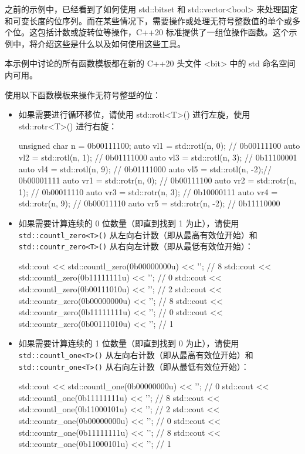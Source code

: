 之前的示例中，已经看到了如何使用 std::bitset 和 std::vector<bool> 来处理固定和可变长度的位序列。而在某些情况下，需要操作或处理无符号整数值的单个或多个位。这包括计数或旋转位等操作，C++20 标准提供了一组位操作函数。这个示例中，将介绍这些是什么以及如何使用这些工具。


本示例中讨论的所有函数模板都在新的 C++20 头文件 <bit> 中的 std 命名空间内可用。


使用以下函数模板来操作无符号整型的位：

\begin{itemize}
\item
如果需要进行循环移位，请使用 std::rotl<T>() 进行左旋，使用 std::rotr<T>() 进行右旋：

\begin{cpp}
unsigned char n = 0b00111100;
auto vl1 = std::rotl(n, 0); // 0b00111100
auto vl2 = std::rotl(n, 1); // 0b01111000
auto vl3 = std::rotl(n, 3); // 0b11100001
auto vl4 = std::rotl(n, 9); // 0b01111000
auto vl5 = std::rotl(n, -2);// 0b00001111
auto vr1 = std::rotr(n, 0);  // 0b00111100
auto vr2 = std::rotr(n, 1);  // 0b00011110
auto vr3 = std::rotr(n, 3);  // 0b10000111
auto vr4 = std::rotr(n, 9);  // 0b00011110
auto vr5 = std::rotr(n, -2); // 0b11110000
\end{cpp}

\item
如果需要计算连续的 0 位数量（即直到找到 1 为止），请使用 \verb|std::countl_zero<T>()| 从左向右计数（即从最高有效位开始）和 \verb|std::countr_zero<T>()| 从右向左计数（即从最低有效位开始）：

\begin{cpp}
std::cout << std::countl_zero(0b00000000u) << '\n'; // 8
std::cout << std::countl_zero(0b11111111u) << '\n'; // 0
std::cout << std::countl_zero(0b00111010u) << '\n'; // 2
std::cout << std::countr_zero(0b00000000u) << '\n'; // 8
std::cout << std::countr_zero(0b11111111u) << '\n'; // 0
std::cout << std::countr_zero(0b00111010u) << '\n'; // 1
\end{cpp}

\item
如果需要计算连续的 1 位数量（即直到找到 0 为止），请使用 \verb|std::countl_one<T>()| 从左向右计数（即从最高有效位开始）和 \verb|std::countr_one<T>()| 从右向左计数（即从最低有效位开始）：

\begin{cpp}
std::cout << std::countl_one(0b00000000u) << '\n'; // 0
std::cout << std::countl_one(0b11111111u) << '\n'; // 8
std::cout << std::countl_one(0b11000101u) << '\n'; // 2
std::cout << std::countr_one(0b00000000u) << '\n'; // 0
std::cout << std::countr_one(0b11111111u) << '\n'; // 8
std::cout << std::countr_one(0b11000101u) << '\n'; // 1
\end{cpp}


\end{itemize}
